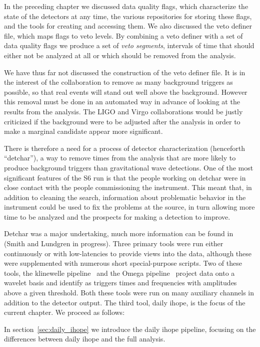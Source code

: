 \newcommand{\darmerr}{\texttt{DARM\_ERR} }

In the preceding chapter we discussed data quality flags, which
characterize the state of the detectors at any time, the various
repositories for storing these flags, and the tools for creating and
accessing them.  We also discussed the veto definer file, which maps
flags to veto levels.  By combining a veto definer with a set of data
quality flags we produce a set of \emph{veto segments}, intervals of
time that should either not be analyzed at all or which should be
removed from the analysis.

We have thus far not discussed the construction of the veto definer
file.  It is in the interest of the collaboration to remove as many
background triggers as possible, so that real events will stand out
well above the background.  However this removal must be done in an
automated way in advance of looking at the results from the analysis.
The LIGO and Virgo collaborations would be justly criticized if the
background were to be adjusted after the analysis in order to make a
marginal candidate appear more significant.

There is therefore a need for a process of detector characterization
(henceforth ``detchar''), a way to remove times from the analysis that
are more likely to produce background triggers than gravitational wave
detections.  One of the most significant features of the S6 run is
that the people working on detchar were in close contact with the
people commissioning the instrument.  This meant that, in addition to
cleaning the search, information about problematic behavior in the
instrument could be used to fix the problems at the source, in turn
allowing more time to be analyzed and the prospects for making a
detection to improve.

Detchar was a major undertaking, much more information can be found in
(Smith and Lundgren in progress).  Three primary tools were run
either continuously or with low-latencies to provide views into the data,
although these were supplemented with numerous short special-purpose
scripts.  Two of these tools, the klinewelle pipeline~\cite{} and the
Omega pipeline~\cite{} project data onto a wavelet basis and identify
as triggers times and frequencies with amplitudes above a given
threshold.  Both these tools were run on many auxiliary channels in
addition to the detector output.  The third tool, daily ihope, is the
focus of the current chapter.  We proceed as follows:  

In section~\ref{sec:daily_ihope} we introduce the daily ihope
pipeline, focusing on the differences between daily ihope and the full
analysis.


